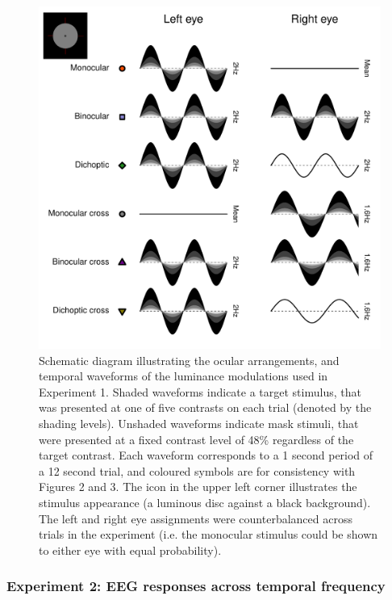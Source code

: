 \documentclass[
]{article}
\begin{document}
\begin{figure}

{\centering \includegraphics{Figures/methodsfig} 

}

\caption{Schematic diagram illustrating the ocular arrangements, and temporal waveforms of the luminance modulations used in Experiment 1. Shaded waveforms indicate a target stimulus, that was presented at one of five contrasts on each trial (denoted by the shading levels). Unshaded waveforms indicate mask stimuli, that were presented at a fixed contrast level of 48\% regardless of the target contrast. Each waveform corresponds to a 1 second period of a 12 second trial, and coloured symbols are for consistency with Figures 2 and 3. The icon in the upper left corner illustrates the stimulus appearance (a luminous disc against a black background). The left and right eye assignments were counterbalanced across trials in the experiment (i.e. the monocular stimulus could be shown to either eye with equal probability).}\label{fig:methodsfig}
\end{figure}

\hypertarget{experiment-2-eeg-responses-across-temporal-frequency}{%
\subsubsection{Experiment 2: EEG responses across temporal frequency}\label{experiment-2-eeg-responses-across-temporal-frequency}}
\end{document}
